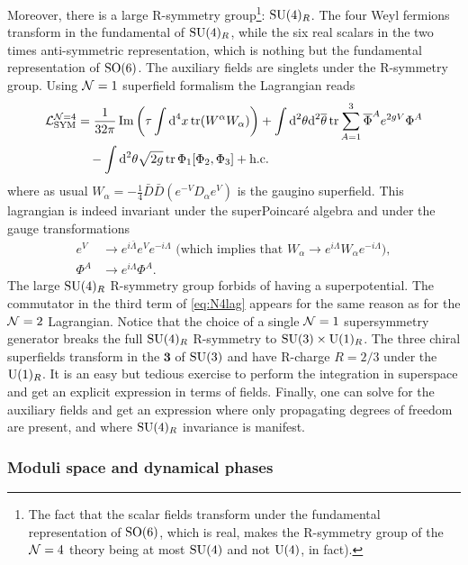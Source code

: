             Moreover, there is a large R-symmetry group\footnote{The fact that the scalar fields transform under the fundamental representation of $\text{SO}(6)$, which is real, makes the R-symmetry group of the $\mathcal{N} = 4$ theory being at most $\text{SU}(4)$ and not $\text{U}(4)$, in fact).}: $\text{SU}(4)_R$. The four Weyl fermions transform in the fundamental of $\text{SU}(4)_R$, while the six real scalars in the two times anti-symmetric representation, which is nothing but the fundamental representation of $\text{SO}(6)$. The auxiliary fields are singlets under the R-symmetry group. Using $\mathcal{N} = 1$ superfield formalism the Lagrangian reads
            \begin{align}
                \begin{split}
                    \mathcal{L}^{\mathcal{N}=4}_{\text{SYM}} &= \frac{1}{32\pi}\Im \left(\tau\int\text{d}^4x\tr(W^\alpha W_\alpha)\right)+\int\text{d}^2\theta\text{d}^2\overline{\theta}\tr\sum^3_{A=1}\overline{\Phi}^Ae^{2gV}\Phi^A\\
                    &\quad-\int\text{d}^2\theta\sqrt{2g}\tr\Phi_1[\Phi_2,\Phi_3]+\text{h.c.}
                \end{split}\label{eq:N4lag}
            \end{align}
            where as usual $W_\alpha=-\frac{1}{4}\bar{D}\bar{D}(e^{-V}D_\alpha e^V)$ is the gaugino superfield. This lagrangian is indeed invariant under the superPoincaré algebra and under the gauge transformations
            \begin{align}
                e^V &\to e^{i\bar{\Lambda}} e^V e^{-i\Lambda} \text{ (which implies that $W_\alpha \to e^{i\Lambda}W_\alpha e^{-i\Lambda}$)},\\
                \Phi^A &\to e^{i\Lambda}\Phi^A.
            \end{align}
            The large $\text{SU}(4)_R$ R-symmetry group forbids of having a superpotential. The commutator in the third term of \eqref{eq:N4lag} appears for the same reason as for the $\mathcal{N} = 2$ Lagrangian. Notice that the choice of a single $\mathcal{N} = 1$ supersymmetry generator breaks the full $\text{SU}(4)_R$ R-symmetry to $\text{SU}(3)\times \text{U}(1)_R$. The three chiral superfields transform in the $\boldsymbol{3}$ of $\text{SU}(3)$ and have R-charge $R = 2/3$ under the $\text{U}(1)_R$. It is an easy but tedious exercise to perform the integration in superspace and get an explicit expression in terms of fields. Finally, one can solve for the auxiliary fields and get an expression where only propagating degrees of freedom are present, and where $\text{SU}(4)_R$ invariance is manifest.

        \subsubsection{Moduli space and dynamical phases}


